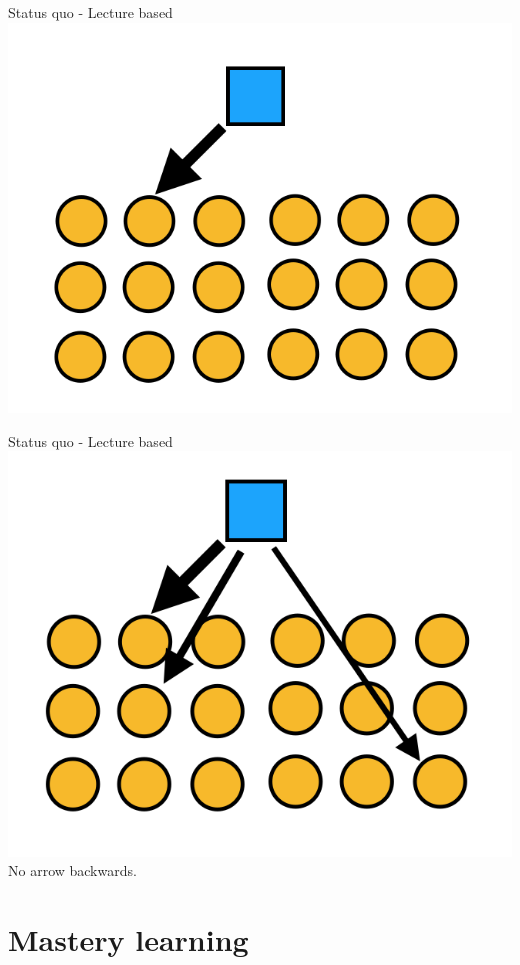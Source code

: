 \documentclass{beamer}
\begin{document}
\begin{frame}{Status quo - Lecture based}
  \centering
    \includegraphics[scale=0.5]{lecturestyle3}
\end{frame}
\begin{frame}{Status quo - Lecture based}
  \centering
    \includegraphics[scale=0.5]{lecturestyle2}\\
    \pause No arrow backwards.
\end{frame}
\section{Mastery learning}
\end{document}
